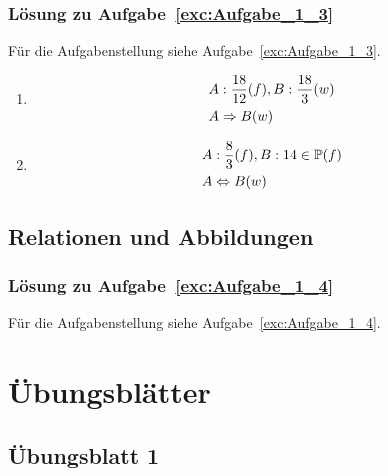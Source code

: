 \subsection{Lösung zu Aufgabe~\ref{exc:Aufgabe_1_3}}
Für die Aufgabenstellung siehe Aufgabe~\vref{exc:Aufgabe_1_3}.
\label{loe:Aufgabe_1_3}
\begin{enumerate}
\item \begin{align*}
	&A: \frac{18}{12} (f), B: \frac{18}{3} (w)\\
	&A \Rightarrow B (w)
	\end{align*}

\item \begin{align*}
	&A: \frac{8}{3} (f), B: 14 \in \mathbb{P} (f)\\
	&A \Leftrightarrow B (w)
	\end{align*}
\end{enumerate}

\section{Relationen und Abbildungen}
\subsection{Lösung zu Aufgabe~\ref{exc:Aufgabe_1_4}}
Für die Aufgabenstellung siehe Aufgabe~\vref{exc:Aufgabe_1_4}.
\label{loe:Aufgabe_1_4}

\chapter{Übungsblätter}
\section{Übungsblatt 1}
